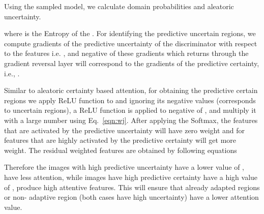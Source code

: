 \documentclass[10pt,twocolumn,letterpaper]{article}
\begin{document}
Using the sampled model, we calculate domain probabilities and aleatoric uncertainty.



where  is the Entropy of the . For identifying the predictive uncertain regions, we compute gradients of the predictive uncertainty  of the discriminator with respect to the features  i.e. , and negative of these gradients which returns through the gradient reversal layer will correspond to the gradients of the predictive certainty, i.e., .



Similar to aleatoric certainty based attention, for obtaining the predictive certain regions we apply ReLU function to  and ignoring its negative values (corresponds to uncertain regions), a   ReLU function is applied to negative of , and multiply it with a large number  using Eq.~\ref{eqn:wj}. After applying the Softmax, the features that are activated by the predictive uncertainty will have zero weight and for features that are highly activated by the predictive certainty will get more weight.
The residual weighted features are obtained by following equations 
\vspace{0.5em}

Therefore the images with high predictive uncertainty have a lower value of , have less attention, while images have high predictive certainty have a high value of , produce high attentive features. This will ensure that already adapted regions or non- adaptive region (both cases have high uncertainty) have a lower attention value.
\end{document}
